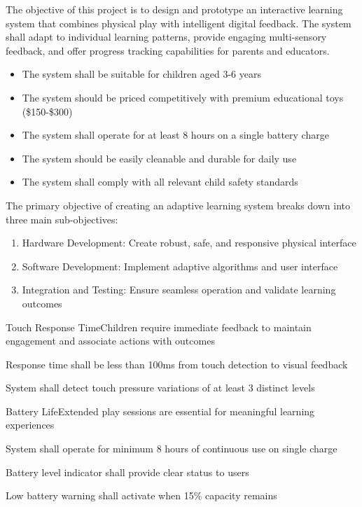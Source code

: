 \documentclass[final]{designreport}
\begin{document}
\objective
The objective of this project is to design and prototype an interactive learning system that combines physical play with intelligent digital feedback. The system shall adapt to individual learning patterns, provide engaging multi-sensory feedback, and offer progress tracking capabilities for parents and educators.

\requirementsspec

\marketingreqs
\begin{itemize}
    \item The system shall be suitable for children aged 3-6 years
    \item The system should be priced competitively with premium educational toys (\$150-\$300)
    \item The system shall operate for at least 8 hours on a single battery charge
    \item The system should be easily cleanable and durable for daily use
    \item The system shall comply with all relevant child safety standards
\end{itemize}

\objectivetree
The primary objective of creating an adaptive learning system breaks down into three main sub-objectives:
\begin{enumerate}
    \item Hardware Development: Create robust, safe, and responsive physical interface
    \item Software Development: Implement adaptive algorithms and user interface
    \item Integration and Testing: Ensure seamless operation and validate learning outcomes
\end{enumerate}

\engineeringreqs

\begin{engineeringreq}{1}{Touch Response Time}{Children require immediate feedback to maintain engagement and associate actions with outcomes}
    \item Response time shall be less than 100ms from touch detection to visual feedback
    \item System shall detect touch pressure variations of at least 3 distinct levels
\end{engineeringreq}

\begin{engineeringreq}{2}{Battery Life}{Extended play sessions are essential for meaningful learning experiences}
    \item System shall operate for minimum 8 hours of continuous use on single charge
    \item Battery level indicator shall provide clear status to users
    \item Low battery warning shall activate when 15\% capacity remains
\end{engineeringreq}
\end{document}
